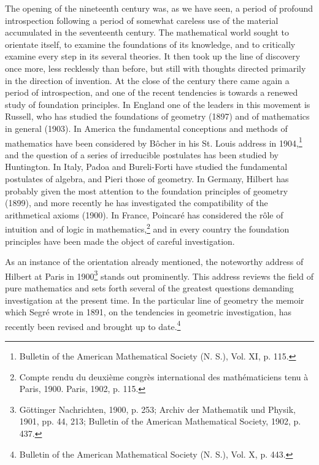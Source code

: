 \documentclass[oneside]{book}
\begin{document}
{The opening of the nineteenth century was, as we have seen, a period
of profound introspection following a period of somewhat careless
use of the material accumulated in the seventeenth century. The
mathematical world sought to orientate itself, to examine the
foundations of its knowledge, and to critically examine every step
in its several theories. It then took up the line of discovery once
more, less recklessly than before, but still with thoughts directed
primarily in the direction of invention. At the close of the
century there came again a period of introspection, and one of the
recent tendencies is towards a renewed study of foundation
principles. In England one of the leaders in this movement is
Russell, who has studied the foundations of geometry (1897) and of
mathematics in general (1903). In America the fundamental
conceptions and methods of mathematics have been considered by
B\^ocher in his St. Louis address in 1904,\footnote{Bulletin of the
American Mathematical Society (N. S.), Vol. XI, p. 115.} and the
question of a series of irreducible postulates has been studied by
Huntington. In Italy, Padoa and Bureli-Forti have studied the
fundamental postulates of algebra, and Pieri those of geometry. In
Germany, Hilbert has probably given the most attention to the
foundation principles of geometry (1899), and more recently he has
investigated the compatibility of the arithmetical axioms (1900). In
France, Poincar\'e has considered the r\^ole of intuition and of
logic in mathematics,\footnote{Compte rendu du deuxi\`eme congr\`es
international des math\'ematiciens tenu \`a Paris, 1900. Paris,
1902, p. 115.} and in every country the foundation principles have
been made the object of careful investigation.

As an instance of the orientation already mentioned, the noteworthy
address of Hilbert at Paris in 1900\footnote{G\"ottinger
Nachrichten, 1900, p. 253; Archiv der Mathematik und Physik, 1901,
pp. 44, 213; Bulletin of the American Mathematical Society, 1902,
p. 437.} stands out prominently. This address reviews the field of
pure mathematics and sets forth several of the greatest questions
demanding investigation at the present time. In the particular line
of geometry the memoir which Segr\'e wrote in 1891, on the
tendencies in geometric investigation, has recently been revised and
brought up to date.\footnote{Bulletin of the American Mathematical
Society (N. S.), Vol. X, p. 443.}

}
\end{document}
